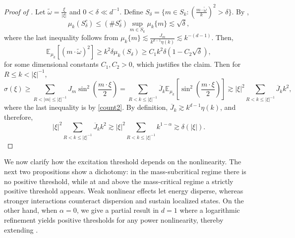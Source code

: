 \documentclass{article}
\numberwithin{equation}{section}
\begin{document}
\begin{proof}[Proof of ]
Let $\tilde{\omega} = \frac{\xi}{|\xi|}$ and $0 < \delta \ll d^{-1}$. Define $S_\delta = \{ m \in S_k: \left(\frac{m \cdot \tilde{\omega}}{k}\right)^2 > \delta\}$. By ,
\begin{equation*}
    \mu_{k} (S_\delta^c) \leq (\# S_\delta^{c}) \sup_{m \in S_k}\mu_{k}\{m\} \lesssim \sqrt{\delta},
\end{equation*}
where the last inequality follows from $\mu_{k}\{m\} \lesssim \frac{J_m}{k^{d-1} \eta(k)} \lesssim k^{-(d-1)}$. Then,
\begin{equation*}
    \mathbb{E}_{\mu_k} \left[\left(m \cdot \tilde{\omega}\right)^2\right] \geq k^2 \delta \mu_{k} (S_{\delta}) \geq C_1 k^2 \delta (1- C_2 \sqrt{\delta}),
\end{equation*}
for some dimensional constants $C_1,C_2>0$, which justifies the claim. Then for $R \leq k < |\xi|^{-1}$,
\begin{equation*}
    \sigma(\xi) \geq \sum_{R < |m| \leq |\xi|^{-1}} J_{m} \sin^2\left(\frac{m \cdot \xi}{2}\right) = \sum_{R < k \leq |\xi|^{-1}} \overline{J}_k \mathbb{E}_{\mu_k} \left[\sin^2\left(\frac{m \cdot \xi}{2}\right)\right] \gtrsim |\xi|^2\sum_{R < k \leq |\xi|^{-1}} \overline{J}_k k^2,
\end{equation*}
where the last inequality is by \eqref{count2}. By definition, $\overline{J}_k \gtrsim k^{d-1} \eta(k)$, and therefore,
\begin{equation*}
    |\xi|^2\sum_{R < k \leq |\xi|^{-1}} \overline{J}_k k^2 \gtrsim |\xi|^2 \sum_{R < k \leq |\xi|^{-1}} k^{1-\alpha} \gtrsim \delta(|\xi|).
\end{equation*}
\end{proof}

We now clarify how the excitation threshold depends on the nonlinearity. The next two propositions show a dichotomy: in the mass-subcritical regime there is no positive threshold, while at and above the mass-critical regime a strictly positive threshold appears. Weak nonlinear effects let energy disperse, whereas stronger interactions counteract dispersion and sustain localized states. On the other hand, when $\alpha = 0$, we give a partial result in $d=1$ where a logarithmic refinement yields positive thresholds for any power nonlinearity, thereby extending .
\end{document}

